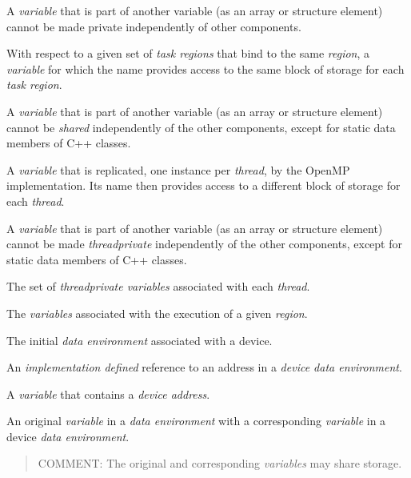 A \emph{variable} that is part of another variable (as an array or structure element) cannot 
be made private independently of other components.
\glossarydefend

\glossarydefstart
With respect to a given set of \emph{task regions} that bind to the same  
\emph{region}, a \emph{variable} for which the name provides access to the same block of storage for 
each \emph{task region}.

A \emph{variable} that is part of another variable (as an array or structure element) cannot 
be \emph{shared} independently of the other components, except for static data members 
of C++ classes.
\glossarydefend

\glossarydefstart
A \emph{variable} that is replicated, one instance per \emph{thread}, by the OpenMP 
implementation. Its name then provides access to a different block of storage for 
each \emph{thread}.

A \emph{variable} that is part of another variable (as an array or structure element) cannot 
be made \emph{threadprivate} independently of the other components, except for static 
data members of C++ classes. 
\glossarydefend

\glossarydefstart
The set of \emph{threadprivate variables} associated with each \emph{thread}.
\glossarydefend

\glossarydefstart
The \emph{variables} associated with the execution of a given \emph{region}. 
\glossarydefend

\glossarydefstart
The initial \emph{data environment} associated with a device.
\glossarydefend
\bigskip

\glossarydefstart
An \emph{implementation defined} reference to an address in a \emph{device
  data environment}.
\glossarydefend

\glossarydefstart
A \emph{variable} that contains a \emph{device address}.
\glossarydefend


\glossarydefstart
An original \emph{variable} in a \emph{data environment} with a corresponding \emph{variable} in a 
device \emph{data environment}.

\begin{quote}
COMMENT: The original and corresponding \emph{variables} may share storage.
\end{quote}
\glossarydefend

